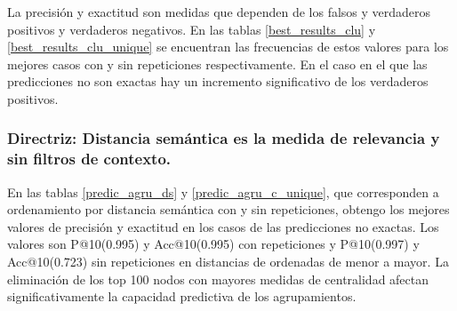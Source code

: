 La precisión y exactitud son medidas que dependen de los falsos y verdaderos positivos y verdaderos negativos. En las  tablas \ref{best_results_clu} y \ref{best_results_clu_unique} se encuentran las frecuencias de estos valores para los mejores casos con y sin repeticiones respectivamente. En el caso en el que las predicciones no son exactas  hay un incremento significativo de los verdaderos positivos.

\subsubsection{Directriz: Distancia semántica es la medida de relevancia y sin filtros de contexto.}

En las tablas \ref{predic_agru_ds} y \ref{predic_agru_c_unique}, que corresponden a ordenamiento por distancia semántica con y sin repeticiones,  obtengo los mejores valores de precisión y exactitud en los casos de las predicciones no exactas. Los valores son  P@10(\num{0,995}) y Acc@10(\num{0,995}) con repeticiones y P@10(\num{0,997}) y Acc@10(\num{0,723}) sin repeticiones en distancias de ordenadas de menor a mayor. La eliminación de los top 100 nodos con mayores medidas de centralidad afectan significativamente la capacidad predictiva de los agrupamientos. 


